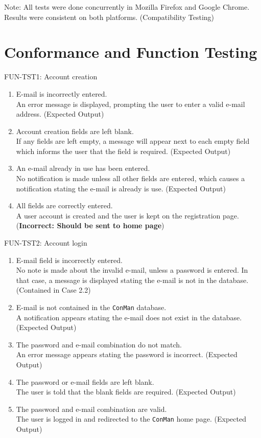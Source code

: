 \documentclass[12pt]{article}
\begin{document}
Note: All tests were done concurrently in Mozilla Firefox and Google Chrome.  Results were consistent on both platforms.  (Compatibility Testing)

\section{Conformance and Function Testing}
FUN-TST1: Account creation
\begin{enumerate}
  \item E-mail is incorrectly entered. \\
    An error message is displayed, prompting the user to enter a valid e-mail address. (Expected Output)
  \item Account creation fields are left blank. \\
    If any fields are left empty, a message will appear next to each empty field which informs the user that the field is required. (Expected Output)
  \item An e-mail already in use has been entered. \\
    No notification is made unless all other fields are entered, which causes a notification stating the e-mail is already is use.  (Expected Output)
  \item All fields are correctly entered. \\
    A user account is created and the user is kept on the registration page. (\textbf{Incorrect: Should be sent to home page})
\end{enumerate}

FUN-TST2: Account login
\begin{enumerate}
  \item E-mail field is incorrectly entered. \\
    No note is made about the invalid e-mail, unless a password is entered.  In that case, a message is displayed stating the e-mail is not in the database.  (Contained in Case 2.2)
  \item E-mail is not contained in the \verb|ConMan| database. \\
    A notification appears stating the e-mail does not exist in the database.  (Expected Output)
  \item The password and e-mail combination do not match. \\
    An error message appears stating the password is incorrect.  (Expected Output)
  \item The password or e-mail fields are left blank. \\
    The user is told that the blank fields are required.  (Expected Output)
  \item The password and e-mail combination are valid. \\
    The user is logged in and redirected to the \verb|ConMan| home page.  (Expected Output)
\end{enumerate}
\end{document}
